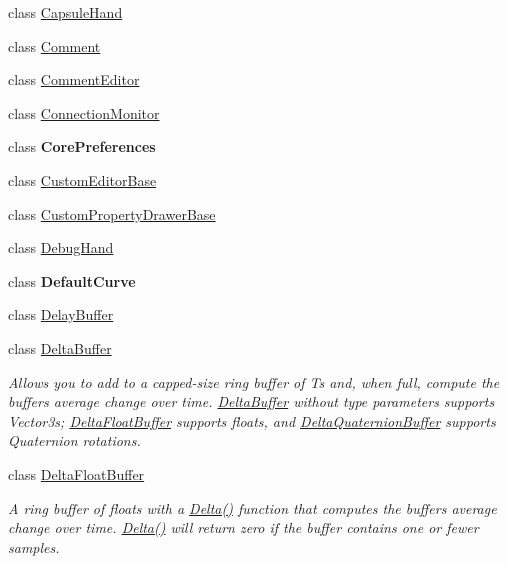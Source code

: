 \begin{DoxyCompactItemize}
class \mbox{\hyperlink{class_leap_1_1_unity_1_1_capsule_hand}{Capsule\+Hand}}
\item 
class \mbox{\hyperlink{class_leap_1_1_unity_1_1_comment}{Comment}}
\item 
class \mbox{\hyperlink{class_leap_1_1_unity_1_1_comment_editor}{Comment\+Editor}}
\item 
class \mbox{\hyperlink{class_leap_1_1_unity_1_1_connection_monitor}{Connection\+Monitor}}
\item 
class {\bfseries Core\+Preferences}
\item 
class \mbox{\hyperlink{class_leap_1_1_unity_1_1_custom_editor_base}{Custom\+Editor\+Base}}
\item 
class \mbox{\hyperlink{class_leap_1_1_unity_1_1_custom_property_drawer_base}{Custom\+Property\+Drawer\+Base}}
\item 
class \mbox{\hyperlink{class_leap_1_1_unity_1_1_debug_hand}{Debug\+Hand}}
\item 
class {\bfseries Default\+Curve}
\item 
class \mbox{\hyperlink{class_leap_1_1_unity_1_1_delay_buffer}{Delay\+Buffer}}
\item 
class \mbox{\hyperlink{class_leap_1_1_unity_1_1_delta_buffer}{Delta\+Buffer}}
\begin{DoxyCompactList}\small\item\em Allows you to add to a capped-\/size ring buffer of Ts and, when full, compute the buffer\textquotesingle{}s average change over time. \mbox{\hyperlink{class_leap_1_1_unity_1_1_delta_buffer}{Delta\+Buffer}} without type parameters supports Vector3s; \mbox{\hyperlink{class_leap_1_1_unity_1_1_delta_float_buffer}{Delta\+Float\+Buffer}} supports floats, and \mbox{\hyperlink{class_leap_1_1_unity_1_1_delta_quaternion_buffer}{Delta\+Quaternion\+Buffer}} supports Quaternion rotations. \end{DoxyCompactList}\item 
class \mbox{\hyperlink{class_leap_1_1_unity_1_1_delta_float_buffer}{Delta\+Float\+Buffer}}
\begin{DoxyCompactList}\small\item\em A ring buffer of floats with a \mbox{\hyperlink{class_leap_1_1_unity_1_1_delta_float_buffer_afc1e79b97babd5397852a33e3aa425a7}{Delta()}} function that computes the buffer\textquotesingle{}s average change over time. \mbox{\hyperlink{class_leap_1_1_unity_1_1_delta_float_buffer_afc1e79b97babd5397852a33e3aa425a7}{Delta()}} will return zero if the buffer contains one or fewer samples. \end{DoxyCompactList}\item 

\end{DoxyCompactItemize}
